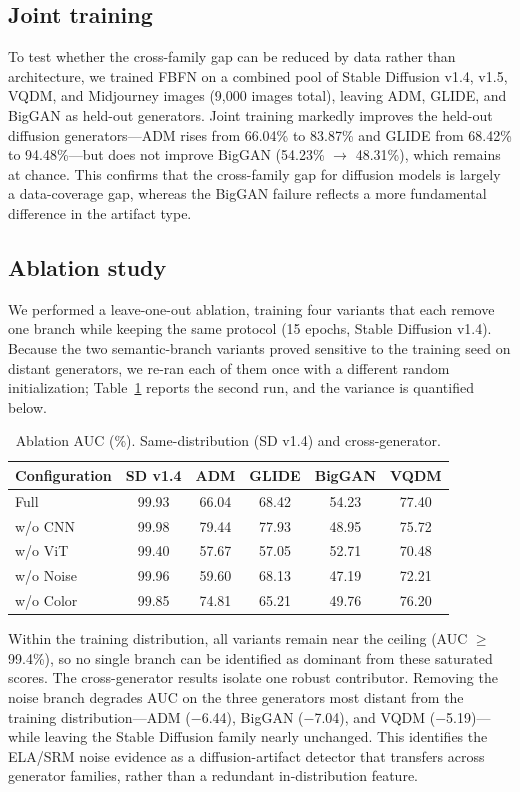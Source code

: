 \documentclass[11pt,a4paper]{article}
\begin{document}
\subsection{Joint training}

To test whether the cross-family gap can be reduced by data rather than architecture, we trained FBFN on a combined pool of Stable Diffusion v1.4, v1.5, VQDM, and Midjourney images (9,000 images total), leaving ADM, GLIDE, and BigGAN as held-out generators. Joint training markedly improves the held-out diffusion generators---ADM rises from 66.04\% to 83.87\% and GLIDE from 68.42\% to 94.48\%---but does not improve BigGAN (54.23\% $\to$ 48.31\%), which remains at chance. This confirms that the cross-family gap for diffusion models is largely a data-coverage gap, whereas the BigGAN failure reflects a more fundamental difference in the artifact type.

\subsection{Ablation study}

We performed a leave-one-out ablation, training four variants that each remove one branch while keeping the same protocol (15 epochs, Stable Diffusion v1.4). Because the two semantic-branch variants proved sensitive to the training seed on distant generators, we re-ran each of them once with a different random initialization; Table~\ref{tab:ablation} reports the second run, and the variance is quantified below.

\begin{table}[h]
\centering
\caption{Ablation AUC (\%). Same-distribution (SD v1.4) and cross-generator.}
\label{tab:ablation}
\begin{tabular}{lccccc}
\toprule
Configuration & SD v1.4 & ADM & GLIDE & BigGAN & VQDM \\
\midrule
Full & 99.93 & 66.04 & 68.42 & 54.23 & 77.40 \\
w/o CNN & 99.98 & 79.44 & 77.93 & 48.95 & 75.72 \\
w/o ViT & 99.40 & 57.67 & 57.05 & 52.71 & 70.48 \\
w/o Noise & 99.96 & 59.60 & 68.13 & 47.19 & 72.21 \\
w/o Color & 99.85 & 74.81 & 65.21 & 49.76 & 76.20 \\
\bottomrule
\end{tabular}
\end{table}

Within the training distribution, all variants remain near the ceiling (AUC $\geq$ 99.4\%), so no single branch can be identified as dominant from these saturated scores. The cross-generator results isolate one robust contributor. Removing the noise branch degrades AUC on the three generators most distant from the training distribution---ADM ($-$6.44), BigGAN ($-$7.04), and VQDM ($-$5.19)---while leaving the Stable Diffusion family nearly unchanged. This identifies the ELA/SRM noise evidence as a diffusion-artifact detector that transfers across generator families, rather than a redundant in-distribution feature.
\end{document}
